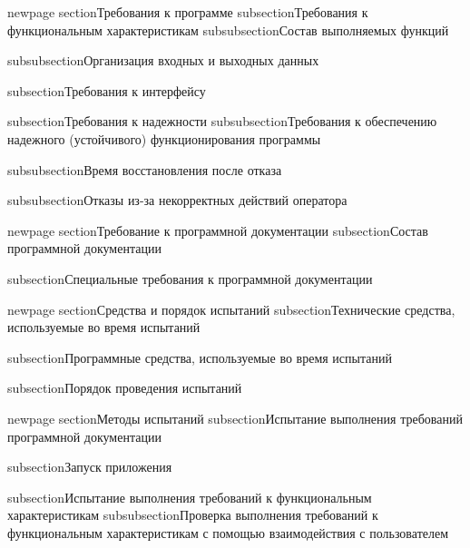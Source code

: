 newpage
section{Требования к программе}
subsection{Требования к функциональным характеристикам}
subsubsection{Состав выполняемых функций}

subsubsection{Организация входных и выходных данных}

subsection{Требования к интерфейсу}

subsection{Требования к надежности}
subsubsection{Требования к обеспечению надежного (устойчивого) функционирования программы}

subsubsection{Время восстановления после отказа}

subsubsection{Отказы из-за некорректных действий оператора}

newpage
section{Требование к программной документации}
subsection{Состав программной документации}

subsection{Специальные требования к программной документации}

newpage
section{Средства и порядок испытаний}
subsection{Технические средства, используемые во время испытаний}

subsection{Программные средства, используемые во время испытаний}

subsection{Порядок проведения испытаний}

newpage
section{Методы испытаний}
subsection{Испытание выполнения требований программной документации}

subsection{Запуск приложения}

subsection{Испытание выполнения требований к функциональным характеристикам}
subsubsection{Проверка выполнения требований к функциональным характеристикам с помощью взаимодействия с пользователем}

